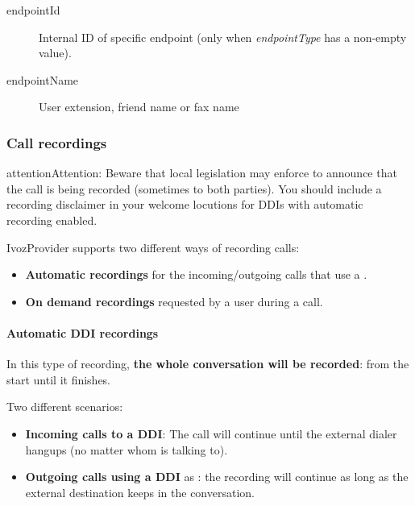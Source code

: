 \documentclass[letterpaper,10pt,english]{sphinxmanual}
\begin{document}
\begin{description}
\item[{endpointId}] \leavevmode{}\label{administration_portal/client/vpbx/calls/call_csv_schedulers:term-endpointid}
Internal ID of specific endpoint (only when \emph{endpointType} has a non-empty value).

\item[{endpointName}] \leavevmode{}\label{administration_portal/client/vpbx/calls/call_csv_schedulers:term-endpointname}
User extension, friend name or fax name

\end{description}


\subsubsection{Call recordings}
\label{administration_portal/client/vpbx/calls/call_recordings::doc}\label{administration_portal/client/vpbx/calls/call_recordings:call-recordings}\label{administration_portal/client/vpbx/calls/call_recordings:id1}
\begin{notice}{attention}{Attention:}
Beware that local legislation may enforce to announce that the
call is being recorded (sometimes to both parties). You should include
a recording disclaimer in your welcome locutions for DDIs with automatic
recording enabled.
\end{notice}

IvozProvider supports two different ways of recording calls:
\begin{itemize}
\item {} 
\textbf{Automatic recordings} for the incoming/outgoing calls that use a
{\hyperref[administration_portal/client/vpbx/ddis:ddis]{}}.

\item {} 
\textbf{On demand recordings} requested by a user during a call.

\end{itemize}


\paragraph{Automatic DDI recordings}
\label{administration_portal/client/vpbx/calls/call_recordings:automatic-ddi-recordings}
In this type of recording, \textbf{the whole conversation will be recorded}: from
the start until it finishes.

Two different scenarios:
\begin{itemize}
\item {} 
\textbf{Incoming calls to a DDI}: The call will continue until the external
dialer hangups (no matter whom is talking to).

\item {} 
\textbf{Outgoing calls using a DDI} as {\hyperref[administration_portal/client/vpbx/ddis:ddis]{}}: the
recording will continue as long as the external destination keeps in the
conversation.

\end{itemize}
\end{document}
